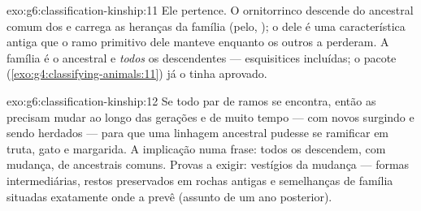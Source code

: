 \begin{solution}{exo:g6:classification-kinship:11}
Ele pertence. O ornitorrinco descende do ancestral comum dos 
e carrega as heranças da família (pelo, ); o  dele é uma
característica antiga que o ramo primitivo dele manteve enquanto os
outros a perderam. A família é o ancestral e \emph{todos} os
descendentes --- esquisitices incluídas; o pacote
(\cref{exo:g4:classifying-animals:11}) já o tinha aprovado.
\end{solution}

\begin{solution}{exo:g6:classification-kinship:12}
Se todo par de ramos se encontra, então as  precisam mudar ao
longo das gerações e de muito tempo --- com  novos surgindo e
sendo herdados --- para que uma linhagem ancestral pudesse se ramificar
em truta, gato e margarida. A implicação numa frase: todos os  descendem, com mudança, de ancestrais comuns. Provas a exigir:
vestígios da mudança --- formas intermediárias, restos preservados em
rochas antigas e semelhanças de família situadas exatamente onde a
 prevê (assunto de um ano posterior).
\end{solution}

